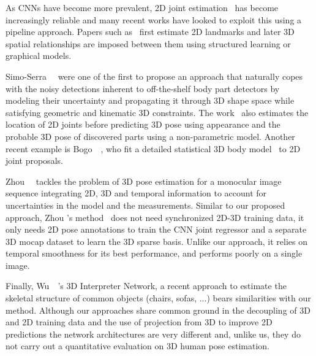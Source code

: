 \documentclass[10pt,twocolumn,letterpaper]{article}
\begin{document}
 
As CNNs have become more prevalent, 2D joint
estimation~\cite{wei2016convolutional} has become increasingly
reliable and many recent works have looked to exploit this using a
pipeline approach. Papers such as~\cite{chen2014articulated,
  jain2013learning, tompson2014joint, pfister2015flowing} first
estimate 2D landmarks and later 3D spatial relationships are imposed
between them using structured learning or graphical models.

Simo-Serra~\etal~\cite{simo2012single} were one of the first to
propose an approach that naturally copes with the noisy
detections inherent to off-the-shelf body part detectors by modeling
their uncertainty and propagating it through 3D shape space while
satisfying  geometric and kinematic 3D constraints. The work~\cite{sanzari2016bayesian} also estimates the
location of 2D joints before predicting 3D pose using appearance and
the probable 3D pose of discovered parts using a %
non-parametric model.  Another recent example is
Bogo~\etal~\cite{bogo2016keep}, who %
fit a detailed statistical 3D body
model~\cite{loper2015smpl} to 2D joint proposals.


Zhou~\etal~\cite{zhou2015sparseness} tackles the
problem of 3D pose estimation for a monocular image sequence
integrating 2D, 3D and temporal information to account for
uncertainties in the model and the measurements. %
Similar to our proposed approach, Zhou \etal's method~\cite{zhou2015sparseness}  does not need
synchronized 2D-3D training data, \ie it only needs 2D pose
annotations to train the CNN joint regressor and a separate 3D mocap
dataset to learn the 3D sparse basis.  Unlike our approach, it relies
on temporal smoothness for its best performance, and performs poorly on 
a single image.

Finally, Wu~\etal~\cite{wu2016single}'s 3D Interpreter Network, a
recent approach to estimate the skeletal structure of common objects
(chairs, sofas, ...) bears similarities with our method. Although our
approaches share common ground in the decoupling of 3D and 2D training
data and the use of projection from 3D to improve 2D predictions the
network architectures are very different and, unlike us, they do not
carry out a quantitative evaluation on 3D human pose
estimation.
\end{document}

